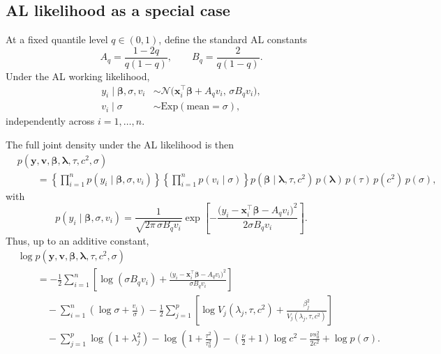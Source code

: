 \documentclass[11pt]{article}
\newcommand{\vect}[1]{\boldsymbol{#1}}
\newcommand{\N}{\mathcal{N}}
\begin{document}
\subsection{AL likelihood as a special case}

At a fixed quantile level $q \in (0,1)$, define the standard AL constants
\begin{equation}
  A_q = \frac{1-2q}{q(1-q)},
  \qquad
  B_q = \frac{2}{q(1-q)}.
\end{equation}
Under the AL working likelihood,
\begin{align}
  y_i \mid \vect{\beta},\sigma,v_i
  &\sim
  \N\!\big(\vect{x}_i^\top \vect{\beta} + A_q v_i,\,
  \sigma B_q v_i\big),\\
  v_i \mid \sigma
  &\sim \mathrm{Exp}(\text{mean}=\sigma),
\end{align}
independently across $i=1,\dots,n$.

The full joint density under the AL likelihood is then
\begin{align}
  &p(\vect{y},\vect{v},\vect{\beta},\vect{\lambda},\tau,c^2,\sigma)
  \nonumber\\
  &\qquad=
  \left\{
    \prod_{i=1}^n
    p(y_i \mid \vect{\beta},\sigma,v_i)
  \right\}
  \left\{
    \prod_{i=1}^n
    p(v_i\mid \sigma)
  \right\}
  p(\vect{\beta}\mid \vect{\lambda},\tau,c^2)\,
  p(\vect{\lambda})\,p(\tau)\,p(c^2)\,p(\sigma),
\end{align}
with
\begin{equation}
  p(y_i \mid \vect{\beta},\sigma,v_i)
  =
  \frac{1}{\sqrt{2\pi\,\sigma B_q v_i}}
  \exp\!\left[
    -\frac{
      \big(
        y_i - \vect{x}_i^\top \vect{\beta} - A_q v_i
      \big)^2
    }{
      2\sigma B_q v_i
    }
  \right].
\end{equation}
Thus, up to an additive constant,
\begin{align}
  &\log p(\vect{y},\vect{v},\vect{\beta},\vect{\lambda},\tau,c^2,\sigma)
  \nonumber\\
  &\qquad=
  -\frac{1}{2}\sum_{i=1}^n
  \left[
    \log(\sigma B_q v_i)
    +
    \frac{
      \big(
        y_i - \vect{x}_i^\top \vect{\beta} - A_q v_i
      \big)^2
    }{
      \sigma B_q v_i
    }
  \right]
  \nonumber\\
  &\qquad\quad
  - \sum_{i=1}^n \left(\log \sigma + \frac{v_i}{\sigma}\right)
  - \frac{1}{2}\sum_{j=1}^p
  \left[
    \log V_j(\lambda_j,\tau,c^2)
    +
    \frac{\beta_j^2}{V_j(\lambda_j,\tau,c^2)}
  \right]
  \nonumber\\
  &\qquad\quad
  - \sum_{j=1}^p \log(1+\lambda_j^2)
  - \log\!\left(1+\frac{\tau^2}{\tau_0^2}\right)
  - \left(\frac{\nu}{2}+1\right)\log c^2
  - \frac{\nu s_0^2}{2c^2}
  + \log p(\sigma).
  \label{eq:logjoint-AL-RHS}
\end{align}
\end{document}
